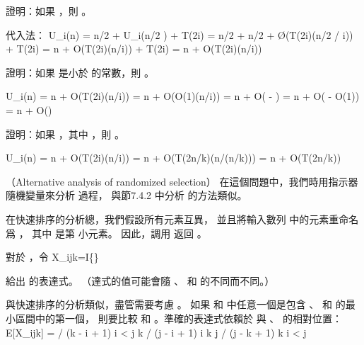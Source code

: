 \startitem
證明：如果 ，則 。
\stopitem

\startANSWER
代入法：
\startformula\startmathalignment
\NC U_i(n)
    \NC = \lfloor n/2 \rfloor + U_i(\lceil n/2 \rceil) + T(2i) \NR
\NC \NC = \lfloor n/2 \rfloor + \lceil n/2 \rceil +
             \O(T(2i)\lg(\lfloor n/2 \rfloor / i)) + T(2i) \NR
\NC \NC = n + O(T(2i)\lg(n/i)) + T(2i) \NR
\NC \NC = n + O(T(2i)\lg(n/i)) \NR
\stopmathalignment\stopformula
\stopANSWER

\startitem
證明：如果  是小於  的常數，則 。
\stopitem

\startANSWER
\startformula\startmathalignment
\NC U_i(n)
    \NC = n + O(T(2i)\lg(n/i)) \NR
\NC \NC = n + O(O(1)\lg(n/i)) \NR
\NC \NC = n + O( - ) \NR
\NC \NC = n + O( - O(1)) \NR
\NC \NC = n + O() \NR
\stopmathalignment\stopformula
\stopANSWER

\startitem
證明：如果 ，其中 ，則 。
\stopitem

\startANSWER
\startformula\startmathalignment
\NC U_i(n)
    \NC = n + O(T(2i)\lg(n/i)) \NR
\NC \NC = n + O(T(2n/k)\lg(n/(n/k))) \NR
\NC \NC = n + O(T(2n/k)) \NR
\stopmathalignment\stopformula
\stopANSWER
\stopigBase
\stopPROBLEM

\startPROBLEM
（Alternative analysis of randomized selection）
在這個問題中，我們時用指示器隨機變量來分析  過程，
與節7.4.2 中分析  的方法類似。

在快速排序的分析總，我們假設所有元素互異，
並且將輸入數列  中的元素重命名爲 ，
其中  是第  小元素。
因此，調用  返回 。

對於 ，令
\startformula
X_{ijk}=I\{\}
\stopformula

\startigBase[a]
\startitem
給出  的表達式。
（\hint 達式的值可能會隨 、  和  的不同而不同。）
\stopitem

\startANSWER
與快速排序的分析類似，盡管需要考慮 。
如果  和  中任意一個是包含 、  和  的最小區間中的第一個，
則要比較  和 。準確的表達式依賴於  與 、  的相對位置：
\startformula
E[X_{ijk}] = \startmathcases
{} / (k - i + 1) \MC {} i < j \le k \NR
{} / (j - i + 1) \MC {} i \le k \le j \NR
{} / (j - k + 1) \MC {} k \le i < j \NR
\stopmathcases
\stopformula
\stopANSWER

